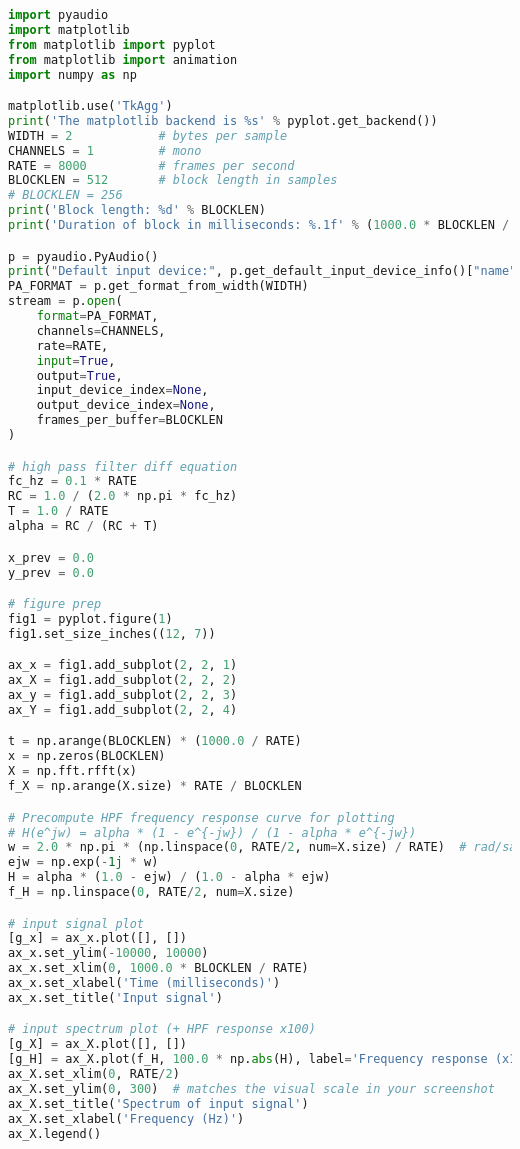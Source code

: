 \documentclass[11pt]{article}
\begin{document}
\begin{lstlisting}[language=python, label={lst:code}, breaklines=true, caption={example code}]
import pyaudio
import matplotlib
from matplotlib import pyplot
from matplotlib import animation
import numpy as np

matplotlib.use('TkAgg')
print('The matplotlib backend is %s' % pyplot.get_backend())
WIDTH = 2            # bytes per sample
CHANNELS = 1         # mono
RATE = 8000          # frames per second
BLOCKLEN = 512       # block length in samples
# BLOCKLEN = 256
print('Block length: %d' % BLOCKLEN)
print('Duration of block in milliseconds: %.1f' % (1000.0 * BLOCKLEN / RATE))

p = pyaudio.PyAudio()
print("Default input device:", p.get_default_input_device_info()["name"])
PA_FORMAT = p.get_format_from_width(WIDTH)
stream = p.open(
    format=PA_FORMAT,
    channels=CHANNELS,
    rate=RATE,
    input=True,          
    output=True,         
    input_device_index=None, 
    output_device_index=None,
    frames_per_buffer=BLOCKLEN
)

# high pass filter diff equation
fc_hz = 0.1 * RATE   
RC = 1.0 / (2.0 * np.pi * fc_hz)
T = 1.0 / RATE
alpha = RC / (RC + T)

x_prev = 0.0
y_prev = 0.0

# figure prep
fig1 = pyplot.figure(1)
fig1.set_size_inches((12, 7)) 

ax_x = fig1.add_subplot(2, 2, 1)
ax_X = fig1.add_subplot(2, 2, 2)
ax_y = fig1.add_subplot(2, 2, 3)
ax_Y = fig1.add_subplot(2, 2, 4)

t = np.arange(BLOCKLEN) * (1000.0 / RATE)  
x = np.zeros(BLOCKLEN)                     
X = np.fft.rfft(x)                         
f_X = np.arange(X.size) * RATE / BLOCKLEN  

# Precompute HPF frequency response curve for plotting 
# H(e^jw) = alpha * (1 - e^{-jw}) / (1 - alpha * e^{-jw})
w = 2.0 * np.pi * (np.linspace(0, RATE/2, num=X.size) / RATE)  # rad/sample
ejw = np.exp(-1j * w)
H = alpha * (1.0 - ejw) / (1.0 - alpha * ejw)
f_H = np.linspace(0, RATE/2, num=X.size)

# input signal plot
[g_x] = ax_x.plot([], [])
ax_x.set_ylim(-10000, 10000)
ax_x.set_xlim(0, 1000.0 * BLOCKLEN / RATE)
ax_x.set_xlabel('Time (milliseconds)')
ax_x.set_title('Input signal')

# input spectrum plot (+ HPF response x100)
[g_X] = ax_X.plot([], [])
[g_H] = ax_X.plot(f_H, 100.0 * np.abs(H), label='Frequency response (x100)', color='green')
ax_X.set_xlim(0, RATE/2)
ax_X.set_ylim(0, 300)  # matches the visual scale in your screenshot
ax_X.set_title('Spectrum of input signal')
ax_X.set_xlabel('Frequency (Hz)')
ax_X.legend()


\end{lstlisting}
\end{document}
